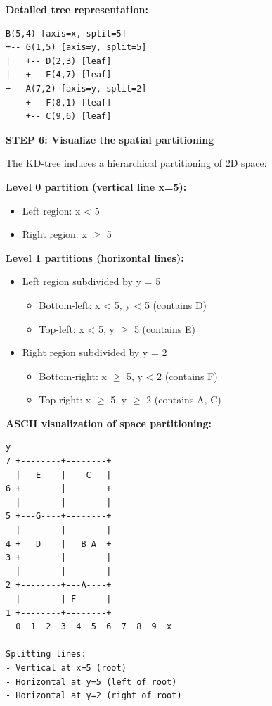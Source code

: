 \documentclass[12pt]{article}
\begin{document}
\begin{solution}
\textbf{Detailed tree representation:}

\begin{verbatim}
B(5,4) [axis=x, split=5]
+-- G(1,5) [axis=y, split=5]
|   +-- D(2,3) [leaf]
|   +-- E(4,7) [leaf]
+-- A(7,2) [axis=y, split=2]
    +-- F(8,1) [leaf]
    +-- C(9,6) [leaf]
\end{verbatim}

\textbf{STEP 6: Visualize the spatial partitioning}

The KD-tree induces a hierarchical partitioning of 2D space:

\textbf{Level 0 partition (vertical line x=5):}
\begin{itemize}
    \item Left region: x < 5
    \item Right region: x $\geq$ 5
\end{itemize}

\textbf{Level 1 partitions (horizontal lines):}
\begin{itemize}
    \item Left region subdivided by y = 5
    \begin{itemize}
        \item Bottom-left: x < 5, y < 5 (contains D)
        \item Top-left: x < 5, y $\geq$ 5 (contains E)
    \end{itemize}
    \item Right region subdivided by y = 2
    \begin{itemize}
        \item Bottom-right: x $\geq$ 5, y < 2 (contains F)
        \item Top-right: x $\geq$ 5, y $\geq$ 2 (contains A, C)
    \end{itemize}
\end{itemize}

\textbf{ASCII visualization of space partitioning:}

\begin{verbatim}
y
7 +--------+--------+
  |   E    |    C   |
6 +        |        +
  |        |        |
5 +---G----+--------+
  |        |        |
4 +   D    |   B A  +
3 +        |        |
  |        |        |
2 +--------+---A----+
  |        | F      |
1 +--------+--------+
  0  1  2  3  4  5  6  7  8  9  x

Splitting lines:
- Vertical at x=5 (root)
- Horizontal at y=5 (left of root)
- Horizontal at y=2 (right of root)
\end{verbatim}


\end{solution}
\end{document}

